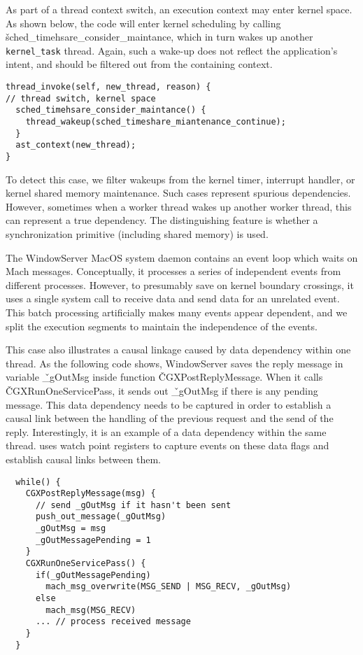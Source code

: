 As part of a thread context switch, an execution context may enter kernel
space. As shown below, the code will enter kernel scheduling by calling
\v{sched\_timehsare\_consider\_maintance}, which in turn wakes up another
\texttt{kernel\_task} thread.  Again, such a wake-up does not reflect the application's intent, and should be filtered out from the containing context.  

{\footnotesize \begin{verbatim}
thread_invoke(self, new_thread, reason) {
// thread switch, kernel space
  sched_timehsare_consider_maintance() {
    thread_wakeup(sched_timeshare_miantenance_continue);
  }
  ast_context(new_thread);
}
\end{verbatim}
}

To detect this case, we filter wakeups from the kernel timer, interrupt
handler, or kernel shared memory maintenance. Such cases represent spurious
dependencies. However, sometimes when a worker thread wakes up another worker
thread, this can represent a true dependency. The distinguishing feature is
whether a synchronization primitive (including shared memory) is used.

The WindowServer MacOS system daemon contains an event loop which waits on Mach
messages. Conceptually, it processes a series of independent events from
different processes. However, to presumably save on kernel boundary crossings, it uses a
single system call to receive data and send data for an unrelated
event. This batch processing artificially makes many events appear dependent, and we split
the execution segments to maintain the independence of the events.

This case also illustrates a causal linkage caused by data dependency
within one thread.  As the following code shows, WindowServer saves the
reply message in variable \v{\_gOutMsg} inside function
\v{CGXPostReplyMessage}.  When it calls \v{CGXRunOneServicePass}, it sends
out \v{\_gOutMsg} if there is any pending message.  This data dependency
needs to be captured in order to establish a causal link between the
handling of the previous request and the send of the reply.
Interestingly, it is an example of a data dependency within the same
thread.  \xxx uses watch point registers to capture events on these data
flags and establish causal links between them.

{\footnotesize \begin{verbatim}
  while() {
    CGXPostReplyMessage(msg) {
      // send _gOutMsg if it hasn't been sent
      push_out_message(_gOutMsg)
      _gOutMsg = msg
      _gOutMessagePending = 1
    }
    CGXRunOneServicePass() {
      if(_gOutMessagePending)
        mach_msg_overwrite(MSG_SEND | MSG_RECV, _gOutMsg)
      else
        mach_msg(MSG_RECV)
      ... // process received message
    }
  }
\end{verbatim}
}

